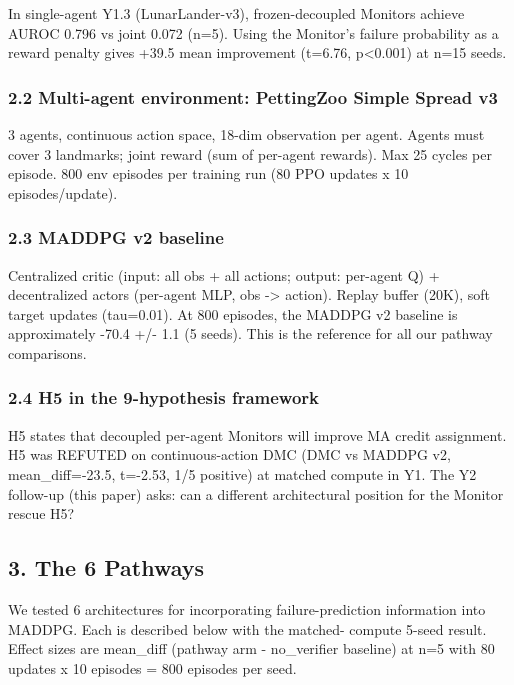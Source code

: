 \documentclass[
]{article}
\begin{document}
In single-agent Y1.3 (LunarLander-v3), frozen-decoupled Monitors achieve
AUROC 0.796 vs joint 0.072 (n=5). Using the Monitor's failure
probability as a reward penalty gives +39.5 mean improvement (t=6.76,
p\textless0.001) at n=15 seeds.

\subsubsection{2.2 Multi-agent environment: PettingZoo Simple Spread
v3}\label{multi-agent-environment-pettingzoo-simple-spread-v3}

3 agents, continuous action space, 18-dim observation per agent. Agents
must cover 3 landmarks; joint reward (sum of per-agent rewards). Max 25
cycles per episode. 800 env episodes per training run (80 PPO updates x
10 episodes/update).

\subsubsection{2.3 MADDPG v2 baseline}\label{maddpg-v2-baseline}

Centralized critic (input: all obs + all actions; output: per-agent Q) +
decentralized actors (per-agent MLP, obs -\textgreater{} action). Replay
buffer (20K), soft target updates (tau=0.01). At 800 episodes, the
MADDPG v2 baseline is approximately -70.4 +/- 1.1 (5 seeds). This is the
reference for all our pathway comparisons.

\subsubsection{2.4 H5 in the 9-hypothesis
framework}\label{h5-in-the-9-hypothesis-framework}

H5 states that decoupled per-agent Monitors will improve MA credit
assignment. H5 was REFUTED on continuous-action DMC (DMC vs MADDPG v2,
mean\_diff=-23.5, t=-2.53, 1/5 positive) at matched compute in Y1. The
Y2 follow-up (this paper) asks: can a different architectural position
for the Monitor rescue H5?

\subsection{3. The 6 Pathways}\label{the-6-pathways}

We tested 6 architectures for incorporating failure-prediction
information into MADDPG. Each is described below with the matched-
compute 5-seed result. Effect sizes are mean\_diff (pathway arm -
no\_verifier baseline) at n=5 with 80 updates x 10 episodes = 800
episodes per seed.
\end{document}
